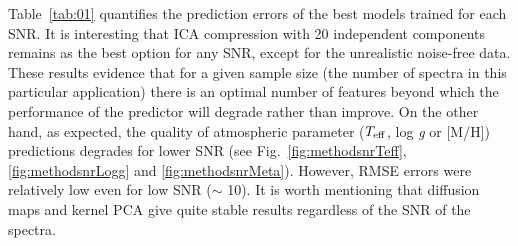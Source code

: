 \documentclass[a4paper,fleqn,usenatbib]{mnras}
\begin{document}
{{{Table~\ref{tab:01} quantifies the prediction errors of the best models
trained for each SNR. It is interesting that ICA compression with 20
independent components remains as the best option for any SNR, except
for the unrealistic noise-free data. These results evidence that
for a given sample size (the number of spectra in this particular 
application)
there is an optimal number of features beyond which the
performance of the predictor will degrade rather than improve. 
On the other hand, as expected, the quality of atmospheric parameter 
($T_{\rm eff}$, log \textit{g} or [M/H]) predictions 
  degrades for lower SNR (see Fig.~\ref{fig:methodsnrTeff}, 
  \ref{fig:methodsnrLogg} and \ref{fig:methodsnrMeta}). However,
RMSE errors were relatively low even for low SNR ($\sim$ 10).
It is worth mentioning that diffusion maps and kernel PCA give 
quite stable results regardless of the SNR of the spectra.


\begin{table}
\centering
\caption{RMSE on the evaluation set of 2986 spectra for the best SVM trained models.}
\label{tab:01}
\end{table}


}}}
\end{document}
